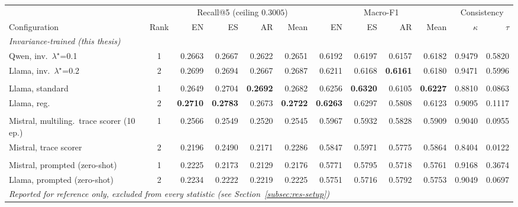 \begin{table}[htbp]
\centering\footnotesize\setlength{\tabcolsep}{3.6pt}
\begin{tabular}{l c rrrr rrrr rr}
\toprule
& & \multicolumn{4}{c}{Recall@5 (ceiling $0.3005$)} & \multicolumn{4}{c}{Macro-F1} & \multicolumn{2}{c}{Consistency} \\
\cmidrule(lr){3-6}\cmidrule(lr){7-10}\cmidrule(lr){11-12}
Configuration & Rank & EN & ES & AR & Mean & EN & ES & AR & Mean & $\kappa$ & $\tau$ \\
\midrule
\multicolumn{12}{l}{\itshape Invariance-trained (this thesis)}\\
\quad Qwen, inv.\ $\lambda^\star$=0.1 & 1 & 0.2663 & 0.2667 & 0.2622 & 0.2651 & 0.6192 & 0.6197 & 0.6157 & 0.6182 & 0.9479 & 0.5820 \\
\quad Llama, inv.\ $\lambda^\star$=0.2 & 2 & 0.2699 & 0.2694 & 0.2667 & 0.2687 & 0.6211 & 0.6168 & \textbf{0.6161} & 0.6180 & 0.9471 & 0.5996 \\
\addlinespace[3pt]
\multicolumn{12}{l}{\itshape Standard multilingual fine-tuning}\\
\quad Llama, standard & 1 & 0.2649 & 0.2704 & \textbf{0.2692} & 0.2682 & 0.6256 & \textbf{0.6320} & 0.6105 & \textbf{0.6227} & 0.8810 & 0.0863 \\
\quad Llama, reg. & 2 & \textbf{0.2710} & \textbf{0.2783} & 0.2673 & \textbf{0.2722} & \textbf{0.6263} & 0.6297 & 0.5808 & 0.6123 & 0.9095 & 0.1117 \\
\addlinespace[3pt]
\multicolumn{12}{l}{\itshape Earlier trace scorers}\\
\quad Mistral, multiling.\ trace scorer (10 ep.) & 1 & 0.2566 & 0.2549 & 0.2520 & 0.2545 & 0.5967 & 0.5932 & 0.5828 & 0.5909 & 0.9040 & 0.0955 \\
\quad Mistral, trace scorer & 2 & 0.2196 & 0.2490 & 0.2171 & 0.2286 & 0.5847 & 0.5971 & 0.5775 & 0.5864 & 0.8404 & 0.0122 \\
\addlinespace[3pt]
\multicolumn{12}{l}{\itshape Prompted baselines}\\
\quad Mistral, prompted (zero-shot) & 1 & 0.2225 & 0.2173 & 0.2129 & 0.2176 & 0.5771 & 0.5795 & 0.5718 & 0.5761 & 0.9168 & 0.3674 \\
\quad Llama, prompted (zero-shot) & 2 & 0.2234 & 0.2222 & 0.2219 & 0.2225 & 0.5751 & 0.5716 & 0.5792 & 0.5753 & 0.9049 & 0.0697 \\
\midrule
\multicolumn{12}{l}{\itshape Reported for reference only, excluded from every statistic (see Section~\ref{subsec:res-setup})}\\

\end{tabular}
\end{table}
